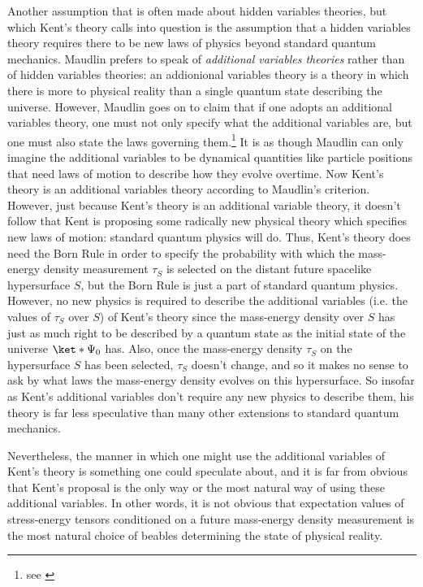Another assumption that is often made about hidden variables theories, but which Kent's theory calls into question is the assumption that a hidden variables theory requires there to be new laws of physics beyond standard quantum mechanics.  Maudlin prefers to speak of \emph{additional variables theories} rather than of hidden variables theories: an addionional variables theory is a theory in which there is more to physical reality than a single quantum state describing the universe. However, Maudlin goes on to claim that if one adopts  an additional variables theory, one must not only specify what the additional variables are, but one must also state the laws governing them.\footnote{see \cite[9]{MAUDLINT1995Tmp} } It is as though Maudlin can only imagine the additional variables to be dynamical quantities like particle positions that need laws of motion to describe how they evolve overtime. Now Kent's theory is an additional variables theory according to Maudlin's criterion. However, just because Kent's theory is an additional variable theory, it doesn't follow that Kent is proposing some radically new physical theory which specifies new laws of motion: standard quantum physics will do. Thus, Kent's theory does need the Born Rule in order to specify the probability with which the mass-energy density measurement $\tau_S$ is selected on the distant future spacelike hypersurface $S$, but the Born Rule is just a part of standard quantum physics. However, no new physics is required to describe the additional variables (i.e. the values of $\tau_S$ over $S$)  of Kent's theory since the mass-energy density over $S$ has just as much right to be described by a quantum state as the initial state  of the universe $\ket*{\Psi_0}$ has. Also, once the mass-energy density $\tau_S$ on the hypersurface $S$ has been selected, $\tau_S$ doesn't change, and so it makes no sense to ask by what laws the mass-energy density evolves on this hypersurface. So insofar as Kent's additional variables don't require any new physics to describe them, his theory is far less speculative than many other extensions to standard quantum mechanics. 

Nevertheless, the manner in which one might use the additional variables of Kent's theory is something one could speculate about, and it is far from obvious that Kent's proposal is the only way or the most natural way of using these additional variables. In other words, it is not obvious that expectation values of stress-energy tensors conditioned on a future mass-energy density measurement is the most natural choice of beables determining the state of physical reality.  

